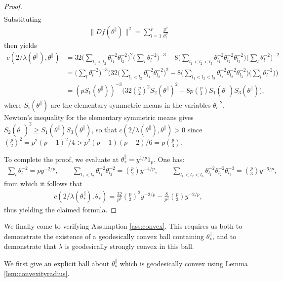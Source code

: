 \documentclass{article}
\newcommand{\tpa}{\theta^{\parallel}}
\theoremstyle{plain}
\theoremstyle{definition}
\theoremstyle{remark}
\begin{document}
\begin{proof}
\begin{align}
    \end{align}
    Substituting
    \begin{align}
        \|Df(\tpa)\|^2= \sum_{l=1}^p\frac{y^2}{\theta_{l}^2}
    \end{align}
    then yields
    \begin{align}
        c(2/\lambda(\tpa),\tpa) &= 32\bigg(\sum_{l_1<l_2}\theta_{l_1}^{-2}\theta_{l_2}^{-2}\bigg)^2\bigg(\sum_{l}\theta_l^{-2}\bigg)^{-3} - 8\bigg(\sum_{l_1<l_2<l_3}\theta_{l_1}^{-2}\theta_{l_2}^{-2}\theta_{l_3}^{-2}\bigg)\bigg(\sum_l\theta_l^{-2}\bigg)^{-2}\\&=\bigg(\sum_{l}\theta_l^{-2}\bigg)^{-3}\bigg(32\bigg(\sum_{l_1<l_2}\theta_{l_1}^{-2}\theta_{l_2}^{-2}\bigg)^2 - 8\bigg(\sum_{l_1<l_2<l_3}\theta_{l_1}^{-2}\theta_{l_2}^{-2}\theta_{l_3}^{-2}\bigg)\bigg(\sum_l\theta_l^{-2}\bigg)\bigg)\\&=(pS_1(\tpa))^{-3}\bigg(32\binom{p}{2}^2S_2(\tpa)^2 - 8p\binom{p}{3} S_1(\tpa)S_3(\tpa)\bigg),
    \end{align}
    where $S_i(\tpa)$ are the elementary symmetric means in the variables $\theta_l^{-2}$. Newton's inequality for the elementary symmetric means gives $S_2(\tpa)^2\geq S_1(\tpa)S_3(\tpa)$, so that $c(2/\lambda(\tpa),\tpa)>0$ since $\binom{p}{2}^2 = p^2(p-1)^2/4 > p^2(p-1)(p-2)/6 = p\binom{p}{3}$.

    To complete the proof, we evaluate at $\tpa_* = y^{1/p}1_p$. One has:
    \begin{align}
        \sum_l\theta_l^{-2} = p y^{-2/p},\qquad\sum_{l_1<l_2}\theta_{l_1}^{-2}\theta_{l_2}^{-2} = \binom{p}{2}y^{-4/p},\qquad \sum_{l_1<l_2<l_3}\theta_{l_1}^{-2}\theta_{l_2}^{-2}\theta_{l_3}^{-3} = \binom{p}{3}y^{-6/p},
    \end{align}
    from which it follows that
    \begin{align}
        c(2/\lambda(\tpa_*),\tpa_*) = \frac{32}{p^3}\binom{p}{2}^2y^{-2/p} - \frac{8}{p^2}\binom{p}{3}y^{-2/p},
    \end{align}
    thus yielding the claimed formula.
\end{proof}

We finally come to verifying Assumption \ref{ass:convex}. This requires us both to demonstrate the existence of a geodesically convex ball containing $\tpa_*$, and to demonstrate that $\lambda$ is geodesically strongly convex in this ball.

We first give an explicit ball about $\tpa_*$ which is geodesically convex using Lemma \ref{lem:convexityradius}.
\end{document}
